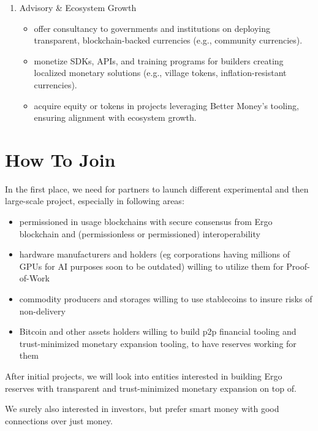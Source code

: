 \documentclass{llncs}   %
\begin{document}
\begin{enumerate}
\item Advisory \& Ecosystem Growth
\begin{itemize}
  \item offer consultancy to governments and institutions on deploying transparent, blockchain-backed currencies (e.g., community currencies).
  \item monetize SDKs, APIs, and training programs for builders creating localized monetary solutions (e.g., village tokens, inflation-resistant currencies).
  \item acquire equity or tokens in projects leveraging Better Money’s tooling, ensuring alignment with ecosystem growth.
\end{itemize}

\end{enumerate}

\section{How To Join}
\label{sec-join}

In the first place, we need for partners to launch different experimental and then large-scale project, especially in
following areas:

\begin{itemize}
  \item permissioned in usage blockchains with secure consensus from Ergo blockchain and (permissionless or permissioned) interoperability
  \item hardware manufacturers and holders (eg corporations having millions of GPUs for AI purposes soon to be outdated) willing to utilize them for
        Proof-of-Work
  \item commodity producers and storages willing to use stablecoins to insure risks of non-delivery
  \item Bitcoin and other assets holders willing to build p2p financial tooling and trust-minimized monetary expansion tooling, to have
        reserves working for them
\end{itemize}

After initial projects, we will look into entities interested in building Ergo reserves with transparent and trust-minimized
monetary expansion on top of.

We surely also interested in investors, but prefer smart money with good connections over just money.


\newpage

 
\end{document}
